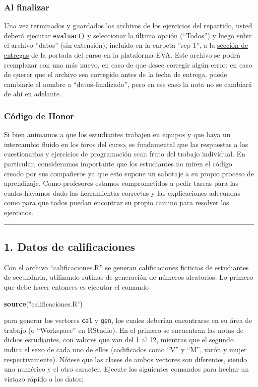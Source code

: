 \documentclass[]{article}
\newenvironment{Shaded}{}{}
\newcommand{\KeywordTok}[1]{\textcolor[rgb]{0.00,0.44,0.13}{\textbf{{#1}}}}
\newcommand{\StringTok}[1]{\textcolor[rgb]{0.25,0.44,0.63}{{#1}}}
\newcommand{\NormalTok}[1]{{#1}}
\begin{document}
\subsubsection{Al finalizar}

Una vez terminados y guardados los archivos de los ejercicios del
repartido, usted deberá ejecutar \texttt{evaluar()} y seleccionar la
última opción (``Todos'') y luego subir el archivo ''datos'' (sin
extensión), incluido en la carpeta ''rep-1'', a la
\href{http://eva.universidad.edu.uy/mod/assignment/view.php?id=95125}{sección
de entregas} de la portada del curso en la plataforma EVA. Este archivo
se podrá reemplazar con uno más nuevo, en caso de que desee corregir
algún error; en caso de querer que el archivo sea corregido antes de la
fecha de entrega, puede cambiarle el nombre a ``datos-finalizado'', pero
en ese caso la nota no se cambiará de ahí en adelante.

\subsubsection{Código de Honor}

Si bien animamos a que los estudiantes trabajen en equipos y que haya un
intercambio fluido en los foros del curso, es fundamental que las
respuestas a los cuestionarios y ejercicios de programación sean fruto
del trabajo individual. En particular, consideramos importante que los
estudiantes no miren el código creado por sus compañeros ya que esto
supone un sabotaje a su propio proceso de aprendizaje. Como profesores
estamos comprometidos a pedir tareas para las cuales hayamos dado las
herramientas correctas y las explicaciones adecuadas como para que todos
puedan encontrar su propio camino para resolver los ejercicios.

\begin{center}\rule{3in}{0.4pt}\end{center}

\subsection{1. Datos de calificaciones}

Con el archivo ``calificaciones.R'' se generan calificaciones ficticias
de estudiantes de secundaria, utilizando rutinas de generación de
números aleatorios. Lo primero que debe hacer entonces es ejecutar el
comando

\begin{Shaded}
\begin{Highlighting}[]
\KeywordTok{source}\NormalTok{(}\StringTok{"calificaciones.R"}\NormalTok{)}
\end{Highlighting}
\end{Shaded}
para generar los vectores \texttt{cal} y \texttt{gen}, los cuales
deberían encontrarse en su área de trabajo (o ``Workspace'' en RStudio).
En el primero se encuentran las notas de dichos estudiantes, con valores
que van del 1 al 12, mientras que el segundo indica el sexo de cada uno
de ellos (codificados como ``V'' y ``M'', varón y mujer
respectivamente). Nótese que las clases de ambos vectores son
diferentes, siendo uno numérico y el otro caracter. Ejecute los
siguientes comandos para hechar un vistazo rápido a los datos:
\end{document}

